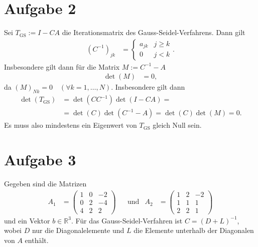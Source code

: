 \documentclass[english, parskip=full]{scrartcl}
\begin{document}
\section*{Aufgabe 2}
Sei $T_\text{GS} := I - CA$ die Iterationsmatrix des Gauss-Seidel-Verfahrens.
Dann gilt 
\begin{align}
(C^{-1})_{jk} &= \begin{cases} a_{jk} & j \ge k \\ 0 & j < k \end{cases}.
\end{align}
Insbesondere gilt dann für die Matrix $M := C^{-1} - A$ 
\begin{align}
\det(M) &= 0,
\end{align}
da $(M)_{Nk} = 0 \quad (\forall k = 1,\dots,N)$.
Insbesondere gilt dann
\begin{align}
\det (T_\text{GS}) &= \det(CC^{-1}) \det(I - CA) = \\
&=  \det(C) \det (C^{-1} - A) = \det(C) \det(M) = 0.
\end{align}
Es muss also mindestens ein Eigenwert von $T_\text{GS}$ gleich Null sein.


\section*{Aufgabe 3}
Gegeben sind die Matrizen
\begin{align}
A_1 &= \begin{pmatrix}
1 & 0 & -2 \\ 0 & 2 & -4 \\ 4 & 2 & 2
\end{pmatrix}&&\text{und}& A_2 &= \begin{pmatrix}
1 & 2 & -2 \\ 1 & 1 & 1 \\ 2 & 2 & 1
\end{pmatrix}
\end{align}
und ein Vektor $b\in\mathbb{R}^3$.
Für das Gauss-Seidel-Verfahren ist $C = (D+L)^{-1}$, wobei $D$ nur die Diagonalelemente und $L$ die Elemente unterhalb der Diagonalen von $A$ enthält.
\end{document}
